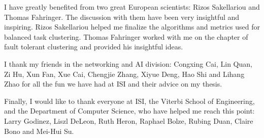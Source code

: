 I have greatly benefited from two great European scientists: Rizos Sakellariou and Thomas Fahringer. The discussion with them have been very insightful and inspiring. Rizos Sakellariou helped me finalize the algorithms and metrics used for balanced task clustering. Thomas Fahringer worked with me on the chapter of fault tolerant clustering and provided his insightful ideas. 

I thank my friends in the networking and AI division: Congxing Cai, Lin Quan, Zi Hu, Xun Fan, Xue Cai, Chengjie Zhang, Xiyue Deng, Hao Shi and Lihang Zhao for all the fun we have had at ISI and their advice on my thesis. 

Finally, I would like to thank everyone at ISI, the Viterbi School of Engineering, and the Department of Computer Science, who have helped me reach this point: Larry Godinez, Liszl DeLeon, Ruth Heron, Raphael Bolze, Rubing Duan, Claire Bono and Mei-Hui Su. 


